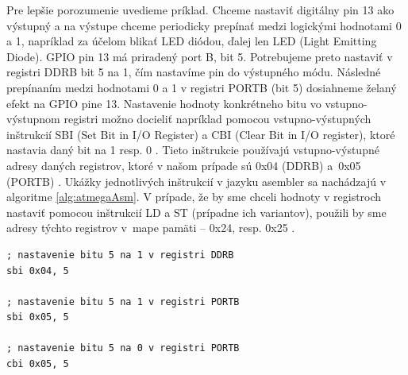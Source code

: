 Pre lepšie porozumenie uvedieme príklad. Chceme nastaviť digitálny pin 13 ako výstupný a na výstupe chceme periodicky prepínať medzi logickými hodnotami 0 a 1, napríklad za účelom blikať LED diódou, ďalej len LED (Light Emitting Diode). GPIO pin 13 má priradený port B, bit 5. Potrebujeme preto nastaviť v registri DDRB bit 5 na 1, čím nastavíme pin do výstupného módu. Následné prepínaním medzi hodnotami 0 a 1 v registri PORTB (bit 5) dosiahneme želaný efekt na GPIO pine 13. Nastavenie hodnoty konkrétneho bitu vo vstupno-výstupnom registri možno docieliť napríklad pomocou vstupno-výstupných inštrukcií SBI (Set Bit in I/O Register) a CBI (Clear Bit in I/O register), ktoré nastavia daný bit na 1 resp. 0 \cite{avrInstruction}. Tieto inštrukcie používajú vstupno-výstupné adresy daných registrov, ktoré v našom prípade sú 0x04 (DDRB) a~0x05 (PORTB) \cite{atmegaData}. Ukážky jednotlivých inštrukcií v jazyku asembler sa nachádzajú v algoritme \ref{alg:atmegaAsm}. V prípade, že by sme chceli hodnoty v registroch nastaviť pomocou inštrukcií LD a ST (prípadne ich variantov), použili by sme adresy týchto registrov v~mape pamäti -- 0x24, resp. 0x25 \cite{atmegaData}.

\begin{lstlisting}[float,language=AVR,caption={Ovládanie vstupno-výstupných registrov na architektúre AVR.}, label=alg:atmegaAsm]
; nastavenie bitu 5 na 1 v registri DDRB
sbi 0x04, 5

; nastavenie bitu 5 na 1 v registri PORTB
sbi 0x05, 5

; nastavenie bitu 5 na 0 v registri PORTB
cbi 0x05, 5
\end{lstlisting}

